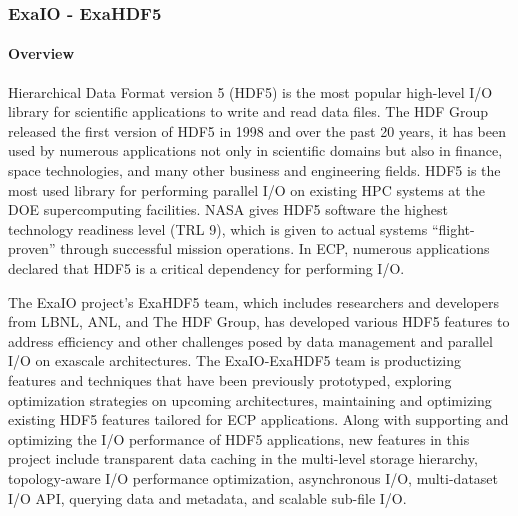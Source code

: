 \noindent

\subsubsection{ ExaIO - ExaHDF5}
\label{subsubsect:exahdf5}

\paragraph{Overview} 
Hierarchical Data Format version 5 (HDF5) is the most popular high-level I/O library for scientific applications to write and read data files.
The HDF Group released the first version of HDF5 in 1998 and over the past 20 years, it has been used by numerous applications not only in scientific domains but also in finance, space technologies, and many other business and engineering fields. HDF5 is the most used library for performing parallel I/O on existing HPC systems at the DOE supercomputing facilities. NASA gives HDF5 software the highest technology readiness level (TRL 9), which is given to actual systems ``flight-proven'' through successful mission operations. In ECP, numerous applications declared that HDF5 is a critical dependency for performing I/O.

The ExaIO project's ExaHDF5 team, which includes researchers and developers from LBNL, ANL, and The HDF Group, has developed various HDF5 features to address efficiency and other challenges posed by data management and parallel I/O on exascale architectures. The ExaIO-ExaHDF5 team is productizing features and techniques that have been previously prototyped, exploring optimization strategies on upcoming architectures, maintaining and optimizing existing HDF5 features tailored for ECP applications. Along with supporting and optimizing the I/O performance of HDF5 applications, new features in this project include transparent data caching in the multi-level storage hierarchy, topology-aware I/O performance optimization, asynchronous I/O, multi-dataset I/O API, querying data and metadata, and scalable sub-file I/O. 

